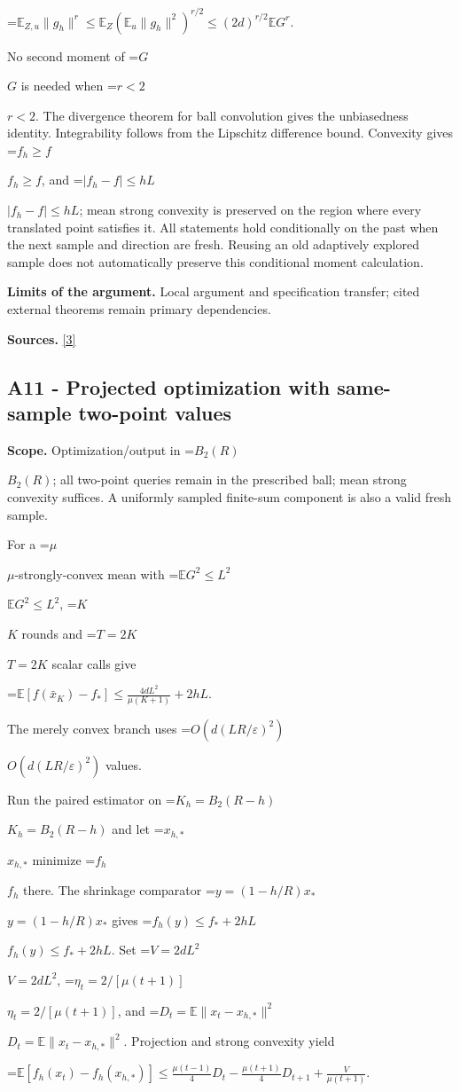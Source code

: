 \documentclass[10pt,a4paper]{article}
\newcommand{\AtlasMath}[1]{\par\begingroup\centering\setbox0=\hbox{$\displaystyle #1$}\ifdim\wd0>1.4\linewidth\typeout{ATLAS WIDE FORMULA: \the\wd0}\fi\ifdim\wd0>\linewidth\resizebox{\linewidth}{!}{\box0}\else\box0\fi\par\endgroup}
\newcommand{\AtlasInlineMath}[1]{\begingroup\setbox0=\hbox{$#1$}\ifdim\wd0>.4\linewidth\endgroup\AtlasMath{#1}\else\endgroup$#1$\fi}
\begin{document}
\AtlasMath{\mathbb E_{Z,u}\|g_h\|^r\le\mathbb E_Z(\mathbb E_u\|g_h\|^2)^{r/2}\le(2d)^{r/2}\mathbb E G^r.}

No second moment of \AtlasInlineMath{G} is needed when \AtlasInlineMath{r<2}. The divergence theorem for ball convolution gives the unbiasedness identity. Integrability follows from the Lipschitz difference bound. Convexity gives \AtlasInlineMath{f_h\ge f}, and \AtlasInlineMath{|f_h-f|\le hL}; mean strong convexity is preserved on the region where every translated point satisfies it. All statements hold conditionally on the past when the next sample and direction are fresh. Reusing an old adaptively explored sample does not automatically preserve this conditional moment calculation.

\textbf{Limits of the argument.} Local argument and specification transfer; cited external theorems remain primary dependencies.

\textbf{Sources.} \href{https://jmlr.org/papers/volume18/16-632/16-632.pdf}{[3]}

\subsection{A11 - Projected optimization with same-sample two-point values}
\textbf{Scope.} Optimization/output in \AtlasInlineMath{B_2(R)}; all two-point queries remain in the prescribed ball; mean strong convexity suffices. A uniformly sampled finite-sum component is also a valid fresh sample.

For a \AtlasInlineMath{\mu}-strongly-convex mean with \AtlasInlineMath{\mathbb E G^2\le L^2}, \AtlasInlineMath{K} rounds and \AtlasInlineMath{T=2K} scalar calls give

\AtlasMath{\mathbb E[f(\bar x_K)-f_*]\le\frac{4dL^2}{\mu(K+1)}+2hL.}

The merely convex branch uses \AtlasInlineMath{O(d(LR/\varepsilon)^2)} values.

Run the paired estimator on \AtlasInlineMath{K_h=B_2(R-h)} and let \AtlasInlineMath{x_{h,*}} minimize \AtlasInlineMath{f_h} there. The shrinkage comparator \AtlasInlineMath{y=(1-h/R)x_*} gives \AtlasInlineMath{f_h(y)\le f_*+2hL}. Set \AtlasInlineMath{V=2dL^2}, \AtlasInlineMath{\eta_t=2/[\mu(t+1)]}, and \AtlasInlineMath{D_t=\mathbb E\|x_t-x_{h,*}\|^2}. Projection and strong convexity yield

\AtlasMath{\mathbb E[f_h(x_t)-f_h(x_{h,*})]\le\frac{\mu(t-1)}4D_t-\frac{\mu(t+1)}4D_{t+1}+\frac{V}{\mu(t+1)}.}
\end{document}
